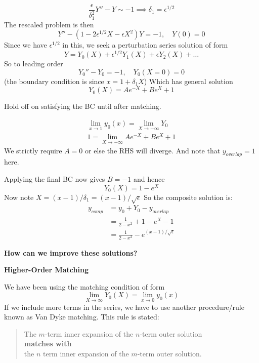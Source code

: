 \documentclass{/home/janmebows/Documents/LatexTemplates/myassignment}
\begin{document}
\[\frac{\epsilon}{\delta_1^2}  Y'' - Y \sim -1 \implies \delta_1 = \epsilon^{1/2}\]
The rescaled problem is then
\[Y'' - (1-2\epsilon^{1/2} X - \epsilon X^2) Y =-1,\quad Y(0)=0\]
Since we have $\epsilon^{1/2}$ in this, we seek a perturbation series solution of form
\[Y = Y_0(X) + \epsilon^{1/2} Y_1(X) +\epsilon Y_2(X) + \ldots\]
So to leading order
\[Y_0'' - Y_0 =-1, \quad Y_0(X =0) = 0\]
(the boundary condition is since $x = 1+ \delta_1 X$)
Which has general solution
\[Y_0(X) = Ae^{-X} + Be^{X} +1\]

Hold off on satisfying the BC until after matching.

\begin{align*}
    \lim_{x\to 1} y_0(x) = \lim_{X\to -\infty} Y_0\\
    1 = \lim_{X\to-\infty} Ae^{-X} + Be^{X} + 1
\end{align*}
We strictly require $A=0$ or else the RHS will diverge. And note that $y_{overlap} = 1$ here.


Applying the final BC now gives $B=-1$ and hence
\[Y_0(X) = 1 -e^{X}\]
Now note $X = (x-1)/\delta_1 = (x-1)/\sqrt{\epsilon}$
So the composite solution is:
\begin{align*}
    y_{comp} &= y_0 + Y_0 - y_{overlap} \\
    &= \frac{1}{2-x^2} + 1-e^X - 1\\
    &= \frac{1}{2-x^2} - e^{(x-1)/\sqrt{\epsilon}}
\end{align*}



\textbf{How can we improve these solutions?}


\textbf{Higher-Order Matching}

We have been using the matching condition of form
\[\lim_{X\to\infty} Y_0(X) = \lim_{x\to0} y_0(x)\]
If we include more terms in the series, we have to use  another procedure/rule known as Van Dyke matching. This rule is stated:

\begin{verse}
The $m$-term inner expansion of the $n$-term outer solution \\
\textbf{matches with} \\
the $n$ term inner expansion of the $m$-term outer solution.        
\end{verse}
\end{document}
